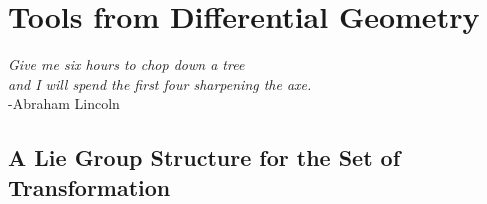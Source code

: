 \chapter{Tools from Differential Geometry}\label{ch:tools}

\begin{flushright}
\emph{Give me six hours to chop down a tree\\ and I will spend the first four sharpening the axe.}
\\ -Abraham Lincoln
\end{flushright}

\vspace{0.6cm}

\section{A Lie Group Structure for the Set of Transformation}\label{se:finite_lie_group}

